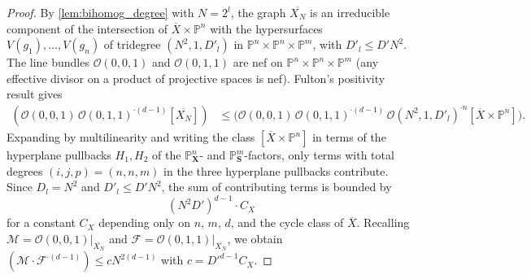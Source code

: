 \begin{proof}
  By \cref{lem:bihomog_degree} with \(N = 2^l\), the graph \(\overline{X_N}\) is an
  irreducible component of the intersection of \(\overline{X} \times \mathbb{P}^n\)
  with the hypersurfaces \(V(g_1), \ldots, V(g_n)\) of tridegree \((N^2, 1, D'_l)\)
  in \(\mathbb{P}^n \times \mathbb{P}^n \times \mathbb{P}^m\), with \(D'_l \le D' N^2\).
  The line bundles \(\mathcal{O}(0,0,1)\) and \(\mathcal{O}(0,1,1)\) are nef on
  \(\mathbb{P}^n \times \mathbb{P}^n \times \mathbb{P}^m\) (any effective divisor on a
  product of projective spaces is nef). Fulton's positivity result
  \cite[Corollary~12.2(a)]{Fulton} gives
  \begin{align*}
    (\mathcal{O}(0,0,1)\,\mathcal{O}(0,1,1)^{\cdot(d-1)}[\overline{X_N}])
    &\le \bigl(\mathcal{O}(0,0,1)\,\mathcal{O}(0,1,1)^{\cdot(d-1)}\,
         \mathcal{O}(N^2,1,D'_l)^{\cdot n}[\overline{X} \times \mathbb{P}^n]\bigr).
  \end{align*}
  Expanding by multilinearity and writing the class \([\overline{X} \times \mathbb{P}^n]\)
  in terms of the hyperplane pullbacks \(H_1, H_2\) of the \(\mathbb{P}^n_\mathbf{X}\)-
  and \(\mathbb{P}^m_\mathbf{S}\)-factors, only terms with total degrees
  \((i, j, p) = (n, n, m)\) in the three hyperplane pullbacks contribute.
  Since \(D_l = N^2\) and \(D'_l \le D' N^2\), the sum of contributing terms
  is bounded by
  \[
    (N^2 D')^{d-1} \cdot C_X
  \]
  for a constant \(C_X\) depending only on \(n\), \(m\), \(d\), and the cycle
  class of \(\overline{X}\). Recalling \(\mathcal{M} = \mathcal{O}(0,0,1)|_{\overline{X_N}}\)
  and \(\mathcal{F} = \mathcal{O}(0,1,1)|_{\overline{X_N}}\), we obtain
  \((\mathcal{M} \cdot \mathcal{F}^{\cdot(d-1)}) \le c N^{2(d-1)}\) with
  \(c = {D'}^{d-1} C_X\).
\end{proof}

